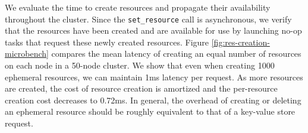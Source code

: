 We evaluate the time to create resources and propagate their availability throughout the cluster.
Since the \lstinline{set_resource} call is asynchronous, we verify that the resources have been created and are available for use by launching no-op tasks that request these newly created resources. %
Figure \ref{fig:res-creation-microbench} compares the mean latency of creating an equal number of resources on each node in a 50-node \ray{} cluster.
We show that even when creating 1000 ephemeral resources, we can maintain 1ms latency per request.
As more resources are created, the cost of resource creation is amortized and the per-resource creation cost decreases to 0.72ms. 
In general, the overhead of creating or deleting an ephemeral resource should be roughly equivalent to that of a key-value store request.



